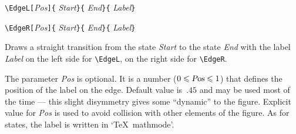 \documentclass[11pt,twoside]{article}
\newlength{\ColoText}%
\newlength{\ColoFigu}%
\newlength{\parindenttemp} %
\newcommand{\noi}{\noindent}
\newcommand{\jsleq}{\leqslant }
\newlength{\jsIndent}%
\begin{document}
\noi 
\hspace*{-\jsIndent}
\begin{minipage}[t]{\ColoText}
        \par\vspace*{0mm}%
\medskip 
        \footnotesize
\verb+\EdgeL[+\textsl{Pos}\verb+]{+%
   \textsl{Start}\verb+}{+%
   \textsl{End}\verb+}{+%
   \textsl{Label}\verb+}+
   
\medskip 
\verb+\EdgeR[+\textsl{Pos}\verb+]{+%
   \textsl{Start}\verb+}{+%
   \textsl{End}\verb+}{+%
   \textsl{Label}\verb+}+
   \normalsize
\end{minipage}%
\hspace*{1.2em}%
\begin{minipage}[t]{\ColoFigu}%
\par\vspace*{0mm}%
Draws a straight transition from the state \textsl{Start} to the 
state \textsl{End} with the label \textsl{Label} on the left side
for \verb+\EdgeL+, on the right side for \verb+\EdgeR+.
\end{minipage}%

\medskip 
\noi 
The parameter {\sl Pos} is optional. 
It is a number ($0\jsleq \text{{\sl Pos}} \jsleq 1$) that defines the 
position of the label on the edge.
Default value is~$.45$ and may be used most of the time ---
this slight disymmetry gives some ``dynamic'' to the figure.
Explicit value for {\sl Pos} is used to avoid collision with other 
elements of the figure. 
As for states, the label is written in `\TeX\ mathmode'.
\end{document}

